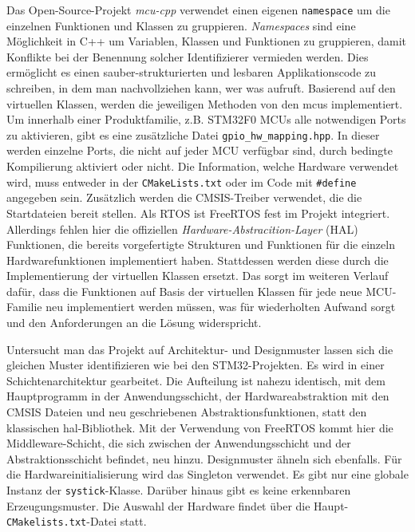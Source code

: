 Das Open-Source-Projekt \emph{mcu-cpp} \cite{github_mcu_cpp} verwendet einen eigenen \texttt{namespace} um die einzelnen Funktionen und Klassen zu gruppieren.
\emph{Namespaces} sind eine Möglichkeit in C++ um Variablen, Klassen und Funktionen zu gruppieren, damit Konflikte bei der Benennung solcher Identifizierer vermieden werden.
Dies ermöglicht es einen sauber-strukturierten und lesbaren Applikationscode zu schreiben, in dem man nachvollziehen kann, wer was aufruft.
Basierend auf den virtuellen Klassen, werden die jeweiligen Methoden von den \gls{mcu}s implementiert.
Um innerhalb einer Produktfamilie, z.B. STM32F0 MCUs alle notwendigen Ports zu aktivieren, gibt es eine zusätzliche Datei \texttt{gpio\_hw\_mapping.hpp}.
In dieser werden einzelne Ports, die nicht auf jeder MCU verfügbar sind, durch bedingte Kompilierung aktiviert oder nicht.
Die Information, welche Hardware verwendet wird, muss entweder in der \texttt{CMakeLists.txt} oder im Code mit \texttt{\#define} angegeben sein.
Zusätzlich werden die CMSIS-Treiber verwendet, die die Startdateien bereit stellen.
Als RTOS ist FreeRTOS fest im Projekt integriert.
Allerdings fehlen hier die offiziellen \emph{Hardware-Abstracition-Layer} (HAL) Funktionen, die bereits vorgefertigte Strukturen und Funktionen für die einzeln Hardwarefunktionen implementiert haben.
Stattdessen werden diese durch die Implementierung der virtuellen Klassen ersetzt.
Das sorgt im weiteren Verlauf dafür, dass die Funktionen auf Basis der virtuellen Klassen für jede neue MCU-Familie neu implementiert werden müssen, was für wiederholten Aufwand sorgt und den Anforderungen an die Lösung widerspricht.

Untersucht man das Projekt auf Architektur- und Designmuster lassen sich die gleichen Muster identifizieren wie bei den STM32-Projekten.
Es wird in einer Schichtenarchitektur gearbeitet.
Die Aufteilung ist nahezu identisch, mit dem Hauptprogramm in der Anwendungsschicht, der Hardwareabstraktion mit den CMSIS Dateien und neu geschriebenen Abstraktionsfunktionen, statt den klassischen \gls{hal}-Bibliothek.
Mit der Verwendung von FreeRTOS kommt hier die Middleware-Schicht, die sich zwischen der Anwendungsschicht und der Abstraktionsschicht befindet, neu hinzu.
Designmuster ähneln sich ebenfalls.
Für die Hardwareinitialisierung wird das Singleton verwendet.
Es gibt nur eine globale Instanz der \texttt{systick}-Klasse.
Darüber hinaus gibt es keine erkennbaren Erzeugungsmuster.
Die Auswahl der Hardware findet über die Haupt-\texttt{CMakelists.txt}-Datei statt.

